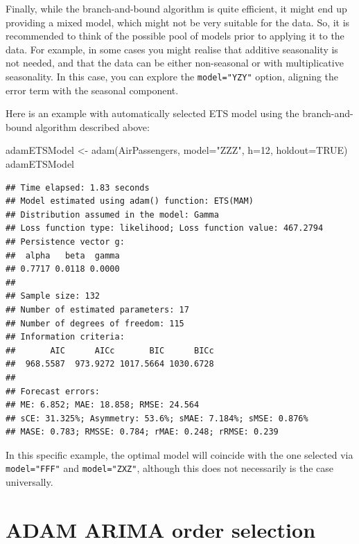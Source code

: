 \documentclass[
]{book}
\newenvironment{Shaded}{\begin{snugshade}}{\end{snugshade}}
\newcommand{\AttributeTok}[1]{\textcolor[rgb]{0.77,0.63,0.00}{#1}}
\newcommand{\ConstantTok}[1]{\textcolor[rgb]{0.00,0.00,0.00}{#1}}
\newcommand{\DecValTok}[1]{\textcolor[rgb]{0.00,0.00,0.81}{#1}}
\newcommand{\FunctionTok}[1]{\textcolor[rgb]{0.00,0.00,0.00}{#1}}
\newcommand{\NormalTok}[1]{#1}
\newcommand{\OtherTok}[1]{\textcolor[rgb]{0.56,0.35,0.01}{#1}}
\newcommand{\StringTok}[1]{\textcolor[rgb]{0.31,0.60,0.02}{#1}}
\theoremstyle{definition}
\theoremstyle{definition}
\theoremstyle{definition}
\theoremstyle{definition}
\theoremstyle{remark}
\begin{document}
Finally, while the branch-and-bound algorithm is quite efficient, it might end up providing a mixed model, which might not be very suitable for the data. So, it is recommended to think of the possible pool of models prior to applying it to the data. For example, in some cases you might realise that additive seasonality is not needed, and that the data can be either non-seasonal or with multiplicative seasonality. In this case, you can explore the \texttt{model="YZY"} option, aligning the error term with the seasonal component.

Here is an example with automatically selected ETS model using the branch-and-bound algorithm described above:

\begin{Shaded}
\begin{Highlighting}[]
\NormalTok{adamETSModel }\OtherTok{\textless{}{-}} \FunctionTok{adam}\NormalTok{(AirPassengers, }\AttributeTok{model=}\StringTok{"ZZZ"}\NormalTok{, }\AttributeTok{h=}\DecValTok{12}\NormalTok{, }\AttributeTok{holdout=}\ConstantTok{TRUE}\NormalTok{)}
\NormalTok{adamETSModel}
\end{Highlighting}
\end{Shaded}

\begin{verbatim}
## Time elapsed: 1.83 seconds
## Model estimated using adam() function: ETS(MAM)
## Distribution assumed in the model: Gamma
## Loss function type: likelihood; Loss function value: 467.2794
## Persistence vector g:
##  alpha   beta  gamma 
## 0.7717 0.0118 0.0000 
## 
## Sample size: 132
## Number of estimated parameters: 17
## Number of degrees of freedom: 115
## Information criteria:
##       AIC      AICc       BIC      BICc 
##  968.5587  973.9272 1017.5664 1030.6728 
## 
## Forecast errors:
## ME: 6.852; MAE: 18.858; RMSE: 24.564
## sCE: 31.325%; Asymmetry: 53.6%; sMAE: 7.184%; sMSE: 0.876%
## MASE: 0.783; RMSSE: 0.784; rMAE: 0.248; rRMSE: 0.239
\end{verbatim}

In this specific example, the optimal model will coincide with the one selected via \texttt{model="FFF"} and \texttt{model="ZXZ"}, although this does not necessarily is the case universally.

\hypertarget{ARIMASelection}{%
\section{ADAM ARIMA order selection}\label{ARIMASelection}}
\end{document}
